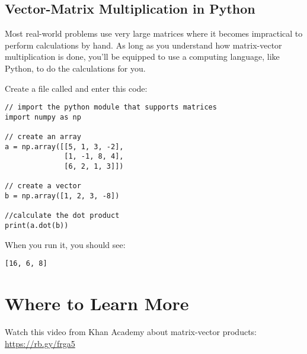 \subsection{Vector-Matrix Multiplication in Python}
Most real-world problems use very large matrices where it becomes impractical to perform calculations by hand. As long as you understand how matrix-vector multiplication is done, you'll be equipped to use a computing language, like Python, to do the calculations for you. 

Create a file called  and enter this code:

\begin{Verbatim}
// import the python module that supports matrices
import numpy as np

// create an array
a = np.array([[5, 1, 3, -2], 
              [1, -1, 8, 4], 
              [6, 2, 1, 3]])

// create a vector 
b = np.array([1, 2, 3, -8])

//calculate the dot product
print(a.dot(b))
\end{Verbatim}

When you run it, you should see:
\begin{Verbatim}
[16, 6, 8]
\end{Verbatim}

\section{Where to Learn More}
Watch this video from Khan Academy about matrix-vector products: \url{https://rb.gy/frga5}

